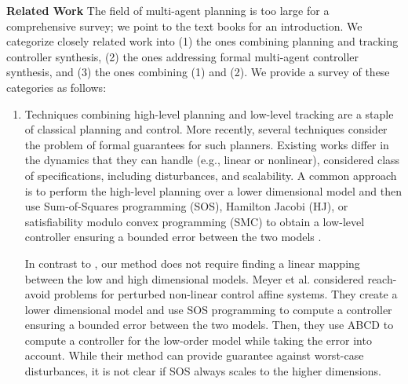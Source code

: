 
\smallskip
\noindent\textbf{Related Work}
%
The field of multi-agent planning is too large for a comprehensive survey; we point to the text books
\cite{LaValle2006,LaValle1998planning,choset2005principles,russel2010AIplanning} for an introduction.
We categorize closely related work into (1) the ones combining planning and tracking controller synthesis, 
(2) the ones addressing formal multi-agent controller synthesis, and 
(3) the ones combining (1) and (2). We provide a survey of these categories as follows:
%
\begin{enumerate}[(1)]
	\item Techniques combining high-level planning and low-level tracking are a staple of classical planning and control. 
More recently, several techniques consider the problem of formal guarantees for such planners.
Existing works differ in the dynamics that they can handle (e.g., linear or nonlinear),
considered class of specifications, including disturbances, and scalability. 
A common approach is to perform the high-level planning over a lower dimensional model and then use
Sum-of-Squares programming (SOS), Hamilton Jacobi (HJ), or satisfiability modulo convex programming (SMC) to obtain a low-level controller ensuring a bounded error between the 
two models \cite{herbert2017fastrack,meyer2019,singh2018robust,Nilsson:2018}. 

In contrast to \cite{herbert2017fastrack,singh2018robust}, our method does not require finding 
a linear mapping between the low and high dimensional models. Meyer et al. \cite{meyer2019} considered reach-avoid problems for perturbed non-linear control affine systems. They create a lower dimensional model and use SOS programming to compute a controller ensuring a bounded error between the two models. Then, they use ABCD to compute a controller for the low-order model while taking the error into account. While their method can provide guarantee against worst-case disturbances, it is not clear if SOS always scales to the higher dimensions.


\end{enumerate}
